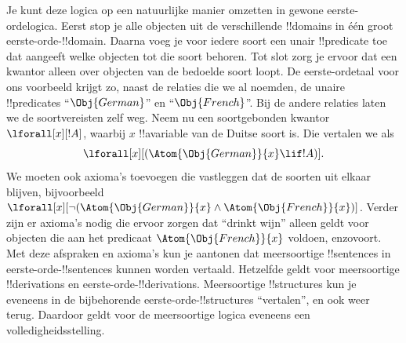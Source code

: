 \documentclass[../../../include/open-logic-section]{subfiles}
\begin{document}
Je kunt deze logica op een natuurlijke manier omzetten in gewone
eerste-ordelogica. Eerst stop je alle objecten uit de verschillende
!!{domain}s in één groot eerste-orde-!!{domain}. Daarna voeg je voor
iedere soort een unair !!{predicate} toe dat aangeeft welke objecten
tot die soort behoren. Tot slot zorg je ervoor dat een kwantor alleen
over objecten van de bedoelde soort loopt. De eerste-ordetaal voor ons
voorbeeld krijgt zo, naast de relaties die we al noemden, de unaire
!!{predicate}s ``$\Obj{German}$'' en ``$\Obj{French}$''. Bij de andere
relaties laten we de soortvereisten zelf weg. Neem nu een
soortgebonden kwantor $\lforall[x][!A]$, waarbij $x$ !!a{variable} van de
Duitse soort is. Die vertalen we als
\[
\lforall[x][(\Atom{\Obj{German}}{x} \lif !A)].
\]
We moeten ook axioma's toevoegen die vastleggen dat de soorten uit
elkaar blijven, bijvoorbeeld
$\lforall[x][\lnot (\Atom{\Obj{German}}{x} \land
  \Atom{\Obj{French}}{x})]$. Verder zijn er axioma's nodig die ervoor
zorgen dat ``drinkt wijn'' alleen geldt voor objecten die aan het
predicaat $\Atom{\Obj{French}}{x}$ voldoen, enzovoort. Met deze afspraken
en axioma's kun je aantonen dat meersoortige !!{sentence}s in
eerste-orde-!!{sentence}s kunnen worden vertaald. Hetzelfde geldt voor
meersoortige !!{derivation}s en eerste-orde-!!{derivation}s.
Meersoortige !!{structure}s kun je eveneens in de bijbehorende
eerste-orde-!!{structure}s ``vertalen'', en ook weer terug. Daardoor
geldt voor de meersoortige logica eveneens een volledigheidsstelling.
\end{document}
